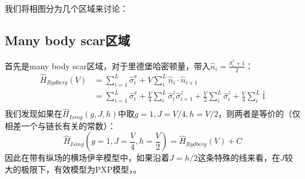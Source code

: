 我们将相图分为几个区域来讨论：


\subsection{Many body scar区域}
首先是many body scar区域，对于里德堡哈密顿量，带入$\hat{n}_i = \frac{\hat{\sigma}_i^z+1}{2}$：
\begin{equation}
\begin{split}
	\hat{H}_{Rydberg}(V) &= \sum_{i=1}^{L} \hat{\sigma}_{i}^{x} + V \sum_{i}^{L} \hat{n}_i\cdot\hat{n}_{i+1} \\
	\quad &= \sum_{i=1}^{L} \hat{\sigma}_{i}^{x} + \frac{V}{4}  \sum_{i}^L \hat{\sigma}_i^z\hat{\sigma}_{i+1}^z + \frac{V}{2} \sum_i^L \hat{\sigma}_i^z  + \frac{V}{4} \sum_i^L \hat{1} \\
\end{split}
\end{equation}
我们发现如果在$\hat{H}_{Ising}(g,J,h)$中取$g=1,J=V/4,h=V/2$，则两者是等价的（仅相差一个与链长有关的常数）：
\begin{equation}
\hat{H}_{Ising}(g=1,J=\frac{V}{4},h=\frac{V}{2}) = \hat{H}_{Rydberg}(V) + C
\end{equation}
因此在带有纵场的横场伊辛模型中，如果沿着$J=h/2$这条特殊的线来看，在$J$较大的极限下，有效模型为PXP模型，。

